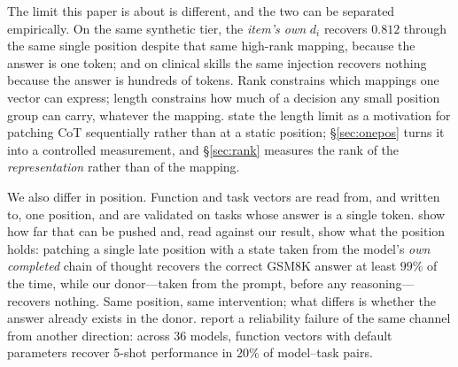 \documentclass{article}
\newcommand{\dvec}{\ensuremath{d}}
\begin{document}
The limit this paper is about is different, and the two can be separated
empirically. On the same synthetic tier, the \emph{item's own} $\dvec_i$
recovers $0.812$ through the same single position despite that same high-rank
mapping, because the answer is one token; and on clinical skills the same
injection recovers nothing because the answer is hundreds of tokens. Rank
constrains which mappings one vector can express; length constrains how much of
a decision any small position group can carry, whatever the mapping.
\citet{dura2026sequentialpatching} state the length limit as a motivation for
patching CoT sequentially rather than at a static position; \S\ref{sec:onepos}
turns it into a controlled measurement, and \S\ref{sec:rank} measures the rank
of the \emph{representation} rather than of the mapping.

We also differ in position. Function and task vectors are read from, and written
to, one position, and are validated on tasks whose answer is a single token.
\citet{mehrafarin2026cothidden} show how far that can be pushed and, read
against our result, show what the position holds: patching a single late
position with a state taken from the model's \emph{own completed} chain of
thought recovers the correct GSM8K answer at least $99\%$ of the time, while our
donor---taken from the prompt, before any reasoning---recovers nothing. Same
position, same intervention; what differs is whether the answer already exists
in the donor. \citet{dasilva2025steeringoff} report a reliability failure of the
same channel from another direction: across 36 models, function vectors with
default parameters recover 5-shot performance in $20\%$ of model--task pairs.
\end{document}
